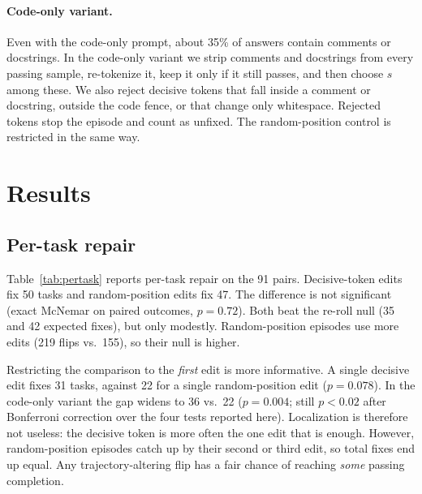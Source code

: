 \documentclass[11pt]{article}
\begin{document}
\paragraph{Code-only variant.}
Even with the code-only prompt, about 35\% of answers contain comments or docstrings. In the code-only variant we strip comments and docstrings from every passing sample, re-tokenize it, keep it only if it still passes, and then choose $s$ among these. We also reject decisive tokens that fall inside a comment or docstring, outside the code fence, or that change only whitespace. Rejected tokens stop the episode and count as unfixed. The random-position control is restricted in the same way.

\section{Results}
\subsection{Per-task repair}
Table~\ref{tab:pertask} reports per-task repair on the 91 pairs. Decisive-token edits fix 50 tasks and random-position edits fix 47. The difference is not significant (exact McNemar on paired outcomes, $p{=}0.72$). Both beat the re-roll null (35 and 42 expected fixes), but only modestly. Random-position episodes use more edits (219 flips vs.\ 155), so their null is higher.

Restricting the comparison to the \emph{first} edit is more informative. A single decisive edit fixes 31 tasks, against 22 for a single random-position edit ($p{=}0.078$). In the code-only variant the gap widens to 36 vs.\ 22 ($p{=}0.004$; still $p<0.02$ after Bonferroni correction over the four tests reported here). Localization is therefore not useless: the decisive token is more often the one edit that is enough. However, random-position episodes catch up by their second or third edit, so total fixes end up equal. Any trajectory-altering flip has a fair chance of reaching \emph{some} passing completion.

\begin{table}[t]
\centering
\small

\caption{Per-task repair on 91 pairs (greedy fails, $\geq 1$ of 10 samples passes), with up to three rank-one edits per task at layer 16. The re-roll null is the expected number of fixes if each edit were a fresh sample. McNemar $p$ compares the two rows of each block on paired task outcomes. In the single-edit column, the $p$-values are 0.078 (all tokens) and 0.004 (code tokens only).}
\label{tab:pertask}
\end{table}
\end{document}
